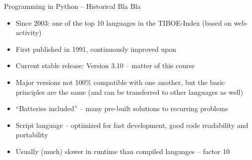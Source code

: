\begin{frame}{Programming in Python -- Historical Bla Bla}
%
\begin{itemize}
\item Since 2003: one of the top 10 languages in the TIBOE-Index (based on web-activity)
\item First published in 1991, continuously improved upon
\item Current stable release: Version 3.10 -- matter of this course
\item Major versions not 100\% compatible with one another, but the basic principles are the same (and can be transferred to other languages as well)
\item \enquote{Batteries included} -- many pre-built solutions to recurring problems
\item Script language -- optimized for fast development, good code readability and portability
\item Usually (much) slower in runtime than compiled languages -- factor 10
\end{itemize}
%
\end{frame}


